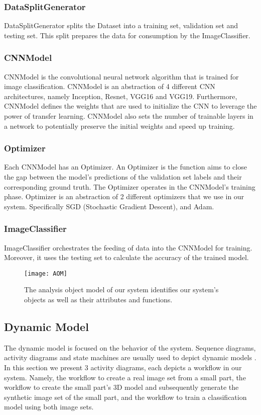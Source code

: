 \subsubsection{DataSplitGenerator}
DataSplitGenerator splits the Dataset into a training set, validation set and testing set. This split prepares the data for consumption by the ImageClassifier.

\subsubsection{CNNModel}
CNNModel is the convolutional neural network algorithm that is trained for image classification. CNNModel is an abstraction of 4 different CNN architectures, namely Inception, Resnet, VGG16 and VGG19. Furthermore, CNNModel defines the weights that are used to initialize the CNN to leverage the power of transfer learning. CNNModel also sets the number of trainable layers in a network to potentially preserve the initial weights and speed up training.

\subsubsection{Optimizer}
Each CNNModel has an Optimizer. An Optimizer is the function aims to close the gap between the model's predictions of the validation set labels and their corresponding ground truth. The Optimizer operates in the CNNModel's training phase. Optimizer is an abstraction of 2 different optimizers that we use in our system. Specifically SGD (Stochastic Gradient Descent), and Adam.

\subsubsection{ImageClassifier}
ImageClassifier orchestrates the feeding of data into the CNNModel for training. Moreover, it uses the testing set to calculate the accuracy of the trained model.

\begin{figure}[H]
\centering
  \texttt{[image: AOM]}
\caption{The analysis object model of our system identifies our system's objects as well as their attributes and functions.}
\label{fig:AOM}
\end{figure}

\subsection{Dynamic Model}\label{dynamic_model}
The dynamic model is focused on the behavior of the system. Sequence diagrams, activity diagrams and state machines are usually used to depict dynamic models \cite{bruegge2004object}. In this section we present 3 activity diagrams, each depicts a workflow in our system. Namely, the workflow to create a real image set from a small part, the workflow to create the small part's 3D model and subsequently generate the synthetic image set of the small part, and the workflow to train a classification model using both image sets.

